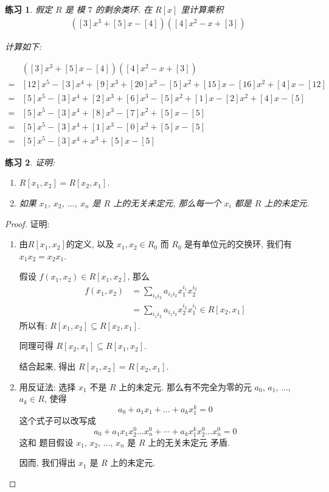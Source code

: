 \documentclass[utf8]{ctexbook}
\newtheorem{exercise}{练习}[section]
\begin{document}
\begin{exercise}
假定  $R$ 是 模 $7$ 的剩余类环. 在 $R[x]$ 里计算乘积
\begin{align*}
( [3] x^3 + [5] x - [4] )( [4] x^2 - x + [3] )
\end{align*}

计算如下:

\begin{align*}
& ( [3] x^3 + [5] x - [4] )( [4] x^2 - x + [3] ) \\
= & [12] x^5 - [3] x^4 + [9] x^3 + [20] x^3 - [5] x^2 + [15] x - [16] x^2 + [4] x - [12] \\
= & [5] x^5 - [3] x^4 + [2] x^3 + [6] x^3 - [5] x^2 + [1] x - [2] x^2 + [4] x - [5] \\
= & [5] x^5 - [3] x^4 + [8] x^3 - [7] x^2 + [5] x  - [5] \\
= & [5] x^5 - [3] x^4 + [1] x^3 - [0] x^2 + [5] x  - [5] \\
= & [5] x^5 - [3] x^4 + x^3 + [5] x  - [5]
\end{align*}

\end{exercise}

\begin{exercise}
证明:
\begin{enumerate}
\item{$R[x_1, x_2] = R[x_2, x_1]$.}
\item{如果 $x_1$, $x_2$, $\ldots$, $x_n$ 是 $R$ 上的无关未定元, 那么每一个 $x_i$ 都是 $R$ 上的未定元.}
\end{enumerate}
\end{exercise}

\begin{proof}
证明:
\begin{enumerate}
\item{由$R[x_1, x_2]$的定义, 以及 $x_1, x_2 \in R_0$ 而 $R_0$ 是有单位元的交换环, 我们有$x_1 x_2 = x_2 x_1$.

假设 $f(x_1, x_2) \in R[x_1, x_2]$, 那么
\begin{align*}
f(x_1, x_2) &= \sum_{i_1 i_2} a_{i_1 i_2} x_1 ^{i_1} x_2 ^{i_2}  \\
&= \sum_{i_1 i_2} a_{i_1 i_2} x_2 ^{i_2} x_1 ^{i_1} \in R[x_2, x_1] 
\end{align*}
所以有: $R[x_1, x_2] \subseteq R[x_2, x_1]$. 

同理可得 $R[x_2, x_1] \subseteq R[x_1, x_2]$.

结合起来, 得出 $R[x_1, x_2] = R[x_2, x_1]$.
}
\item{用反证法: 选择 $x_1$ 不是 $R$ 上的未定元. 那么有不完全为零的元 $a_0$, $a_1$, $\ldots$, $a_k \in R$, 使得
\begin{equation}
a_0 + a_1 x_1 + \ldots + a_k x_1 ^k = 0
\end{equation}
这个式子可以改写成
\begin{equation}
a_0 + a_1 x_1 x_2 ^0 \ldots x_n ^0 + \cdots + a_k x_1 ^k x_2 ^0 \ldots x_n ^0 = 0
\end{equation}
这和 题目假设 $x_1$, $x_2$, $\ldots$, $x_n$ 是 $R$ 上的无关未定元 矛盾.

因而, 我们得出 $x_1$ 是 $R$ 上的未定元.
}
\end{enumerate}
\end{proof}
\end{document}
